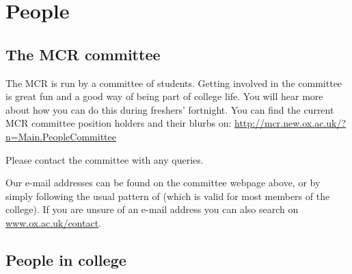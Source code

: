 
\chapter{People}

\section{The MCR committee}

The MCR is run by a committee of students. Getting involved in the committee is great fun and a good way of being part of college life. You will hear more about how you can do this during freshers' fortnight. You can find the current MCR committee position holders and their blurbs on:
\url{http://mcr.new.ox.ac.uk/?n=Main.PeopleCommittee}

\noindent Please contact the committee with any queries. 

\noindent Our e-mail addresses can be found on the committee webpage above, or
by simply following the usual pattern of
\emph{} (which is valid for most
members of the college).
If you are unsure of an e-mail address you can also search on
\url{www.ox.ac.uk/contact}.

\section{People in college}

